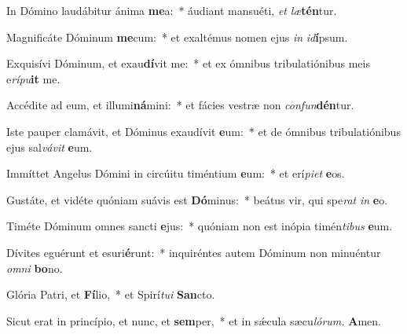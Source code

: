 \item In Dómino laudábitur ánima \textbf{me}a:~* áudiant mansuéti, \textit{et} \textit{læ}\textbf{tén}tur.
\item Magnificáte Dóminum \textbf{me}cum:~* et exaltémus nomen ejus \textit{in} \textit{id}\textbf{í}psum.
\item Exquisívi Dóminum, et exau\textbf{dí}vit me:~* et ex ómnibus tribulatiónibus meis e\textit{rípu}\textbf{it} me.
\item Accédite ad eum, et illumi\textbf{ná}mini:~* et fácies vestræ non \textit{confun}\textbf{dén}tur.
\item Iste pauper clamávit, et Dóminus exaudívit \textbf{e}um:~* et de ómnibus tribulatiónibus ejus sal\textit{vávit} \textbf{e}um.
\item Immíttet Angelus Dómini in circúitu timéntium \textbf{e}um:~* et erí\hspace{0.03em}\textit{piet} \textbf{e}os.
\item Gustáte, et vidéte quóniam suávis est \textbf{Dó}minus:~* beátus vir, qui spe\textit{rat} \textit{in} \textbf{e}o.
\item Timéte Dóminum omnes sancti \textbf{e}jus:~* quóniam non est inópia timén\textit{tibus} \textbf{e}um.
\item Dívites eguérunt et esuri\textbf{é}runt:~* inquiréntes autem Dóminum non minuéntur \textit{omni} \textbf{bo}no.
\item Glória Patri, et \textbf{Fí}lio,~* et Spirí\hspace{0.03em}\textit{tui} \textbf{San}cto.
\item Sicut erat in princípio, et nunc, et \textbf{sem}per,~* et in sǽcula sæcu\hspace{0.03em}\textit{lórum.} \textbf{A}men.